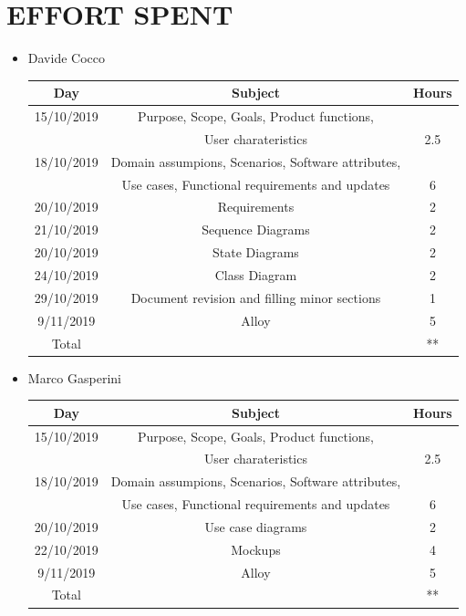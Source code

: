 \documentclass[12pt,a4paper]{article}
\begin{document}
\newpage
\section{EFFORT	SPENT}
\begin{itemize}
\item {Davide Cocco}
 \begin{center}
			\begin{tabular}{| c | c | c |}
				\hline
				Day & Subject & Hours \\ \hline
				15/10/2019 & Purpose, Scope, Goals, Product functions,\\
				&User charateristics & 2.5 \\
				18/10/2019 & Domain assumpions, Scenarios, Software attributes, \\
				& Use cases, Functional requirements and updates  & 6\\
				20/10/2019 & Requirements  & 2\\	
				21/10/2019 & Sequence Diagrams  & 2\\
				20/10/2019 & State Diagrams  & 2\\	
				24/10/2019 & Class Diagram  & 2\\	
				29/10/2019 & Document revision and filling minor sections & 1\\	
				9/11/2019 & Alloy & 5\\	
				\hline
				Total & & ** \\
				\hline
			\end{tabular}
		\end{center}
\item {Marco Gasperini}
\begin{center}
			\begin{tabular}{| c | c | c |}
				\hline
				Day & Subject & Hours \\ \hline
				15/10/2019 & Purpose, Scope, Goals, Product functions,\\
				&User charateristics & 2.5 \\
				18/10/2019 & Domain assumpions, Scenarios, Software attributes, \\
				& Use cases, Functional requirements and updates  & 6\\
				20/10/2019 & Use case diagrams & 2\\	
				22/10/2019 & Mockups & 4\\	
				9/11/2019 & Alloy & 5\\	
				\hline
				Total & & ** \\
				\hline
			\end{tabular}
\end{center}
\end{itemize}
\end{document}
